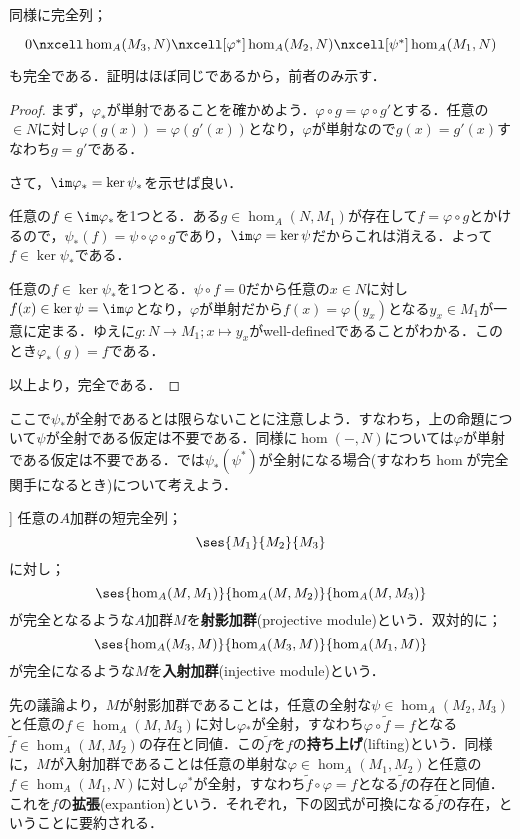 同様に完全列；
\[\begin{tikzcd}
0\nxcell\hom_A(M_3,N)\nxcell[\varphi^\ast]\hom_A(M_2,N)\nxcell[\psi^\ast]\hom_A(M_1,N)
\end{tikzcd}\]
も完全である．証明はほぼ同じであるから，前者のみ示す．
\begin{proof}
	まず，$\varphi_\ast $が単射であることを確かめよう．$\varphi\circ g=\varphi\circ g'$とする．任意の$\in N$に対し$\varphi(g(x))=\varphi(g'(x))$となり，$\varphi$が単射なので$g(x)=g'(x)$すなわち$g=g'$である．
	
	さて，$\im\varphi_\ast =\ker\psi_\ast $を示せば良い．
	\begin{mrkw}
		\item 
		任意の$f\in\im\varphi_\ast$を1つとる．ある$g\in\hom_A(N,M_1)$が存在して$f=\varphi\circ g$とかけるので，$\psi_\ast (f)=\psi\circ\varphi\circ g$であり，$\im\varphi=\ker\psi$だからこれは消える．よって$f\in\ker\psi_\ast $である．
		\item 
		任意の$f\in\ker\psi_\ast $を1つとる．$\psi\circ f=0$だから任意の$x\in N$に対し$f(x)\in\ker\psi=\im\varphi$となり，$\varphi$が単射だから$f(x)=\varphi(y_x)$となる$y_x\in M_1$が一意に定まる．ゆえに$g:N\to M_1;x\mapsto y_x$がwell-definedであることがわかる．このとき$\varphi_\ast (g)=f$である．
	\end{mrkw}
	以上より，完全である．
\end{proof}

ここで$\psi_\ast $が全射であるとは限らないことに注意しよう．すなわち，上の命題について$\psi$が全射である仮定は不要である．同様に$\hom(-,N)$については$\varphi$が単射である仮定は不要である．では$\psi_\ast(\psi^\ast)$が全射になる場合(すなわち$\hom$が完全関手になるとき)について考えよう．
\begin{defi}
	]
	任意の$A$加群の短完全列；
	\[\ses{M_1}{M_2}{M_3}\]
	に対し；
	\[\ses{\hom_A(M,M_1)}{\hom_A(M,M_2)}{\hom_A(M,M_3)}\]
	が完全となるような$A$加群$M$を\textbf{射影加群}(projective module)という．双対的に；
	\[\ses{\hom_A(M_3,M)}{\hom_A(M_3,M)}{\hom_A(M_1,M)}\]
	が完全になるような$M$を\textbf{入射加群}(injective module)という．
\end{defi}

先の議論より，$M$が射影加群であることは，任意の全射な$\psi\in\hom_A(M_2,M_3)$と任意の$f\in\hom_A(M,M_3)$に対し$\varphi{}_\ast $が全射，すなわち$\varphi\circ\widetilde{f}=f$となる$\widetilde{f}\in\hom_A(M,M_2)$の存在と同値．この$\widetilde{f}$を$f$の\textbf{持ち上げ}(lifting)という．同様に，$M$が入射加群であることは任意の単射な$\varphi\in\hom_A(M_1,M_2)$と任意の$f\in\hom_A(M_1,N)$に対し$\varphi^\ast $が全射，すなわち$\widetilde{f}\circ\varphi=f$となる$\widetilde{f}$の存在と同値．これを$f$の\textbf{拡張}(expantion)という．それぞれ，下の図式が可換になる$\widetilde{f}$の存在，ということに要約される．

